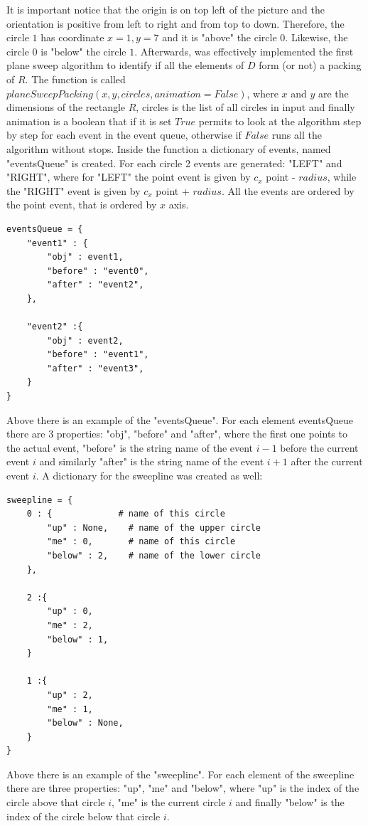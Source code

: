 \documentclass[12pt]{article}
\begin{document}
\noindent It is important notice that the origin is on top left of the picture and the orientation is positive from left to right and from top to down. Therefore, the circle $1$ has coordinate $x=1, y=7$ and it is "above" the circle $0$. Likewise, the circle $0$ is "below" the circle $1$. Afterwards, was effectively implemented the first plane sweep algorithm to identify if all the elements of $D$ form (or not) a packing of $R$. The function is called $planeSweepPacking(x, y, circles, animation = False)$, where $x$ and $y$ are the dimensions of the rectangle $R$, circles is the list of all circles in input and finally animation is a boolean that if it is set $True$ permits to look at the algorithm step by step for each event in the event queue, otherwise if $False$ runs all the algorithm without stops. Inside the function a dictionary of events, named "eventsQueue" is created. For each circle 2 events are generated: "LEFT" and "RIGHT", where for "LEFT" the point event is given by $c_x$ point - $radius$, while the "RIGHT" event is given by $c_x$ point + $radius$. All the events are ordered by the point event, that is ordered by $x$ axis.  

\begin{lstlisting}
eventsQueue = {
	"event1" : {
		"obj" : event1,
		"before" : "event0",
		"after" : "event2",
	},
	
	"event2" :{
		"obj" : event2,
		"before" : "event1",
		"after" : "event3",
	}
}
\end{lstlisting}

\noindent Above there is an example of the "eventsQueue". For each element eventsQueue there are 3 properties: "obj", "before" and "after", where the first one points to the actual event, "before" is the string name of the event $i-1$ before the current event $i$ and similarly "after" is the string name of the event $i+1$ after the current event $i$. A dictionary for the sweepline was created as well:

\begin{lstlisting}
sweepline = {
	0 : {             # name of this circle
		"up" : None,    # name of the upper circle
		"me" : 0,       # name of this circle
		"below" : 2,    # name of the lower circle
	},
	
	2 :{
		"up" : 0,
		"me" : 2,
		"below" : 1,
	}
	
	1 :{
		"up" : 2,
		"me" : 1,
		"below" : None,
	}
}
\end{lstlisting}
Above there is an example of the "sweepline". For each element of the sweepline there are three properties: "up", "me" and "below", where "up" is the index of the circle above that circle $i$, "me" is the current circle $i$ and finally "below" is the index of the circle below that circle $i$. \\
\end{document}
